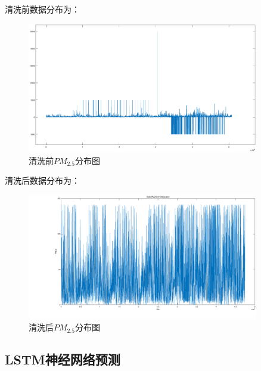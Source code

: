 \documentclass[UTF8]{ctexart}
\begin{document}
清洗前数据分布为：
\begin{figure}[H] %
    \centering %
    \includegraphics[width=0.9\textwidth]{./picture/untide.eps} %
    \caption{清洗前$PM_{2.5}$分布图} 
\end{figure}

清洗后数据分布为：
\begin{figure}[H] %
    \centering %
    \includegraphics[width=0.9\textwidth]{./picture/DailyPM2.5ofhickenpoxeps.eps} %
    \caption{清洗后$PM_{2.5}$分布图} 
\end{figure}

\newpage
\subsection{LSTM神经网络预测}
\end{document}
